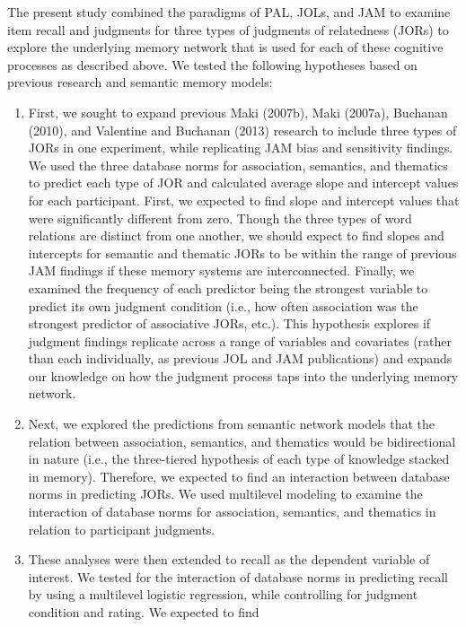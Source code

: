 \documentclass[english,man]{apa6}
\theoremstyle{definition}
\theoremstyle{definition}
\theoremstyle{definition}
\theoremstyle{remark}
\begin{document}
The present study combined the paradigms of PAL, JOLs, and JAM to
examine item recall and judgments for three types of judgments of
relatedness (JORs) to explore the underlying memory network that is used
for each of these cognitive processes as described above. We tested the
following hypotheses based on previous research and semantic memory
models:

\begin{enumerate}
\def\labelenumi{\arabic{enumi})}
\item
  First, we sought to expand previous Maki (2007b), Maki (2007a),
  Buchanan (2010), and Valentine and Buchanan (2013) research to include
  three types of JORs in one experiment, while replicating JAM bias and
  sensitivity findings. We used the three database norms for
  association, semantics, and thematics to predict each type of JOR and
  calculated average slope and intercept values for each participant.
  First, we expected to find slope and intercept values that were
  significantly different from zero. Though the three types of word
  relations are distinct from one another, we should expect to find
  slopes and intercepts for semantic and thematic JORs to be within the
  range of previous JAM findings if these memory systems are
  interconnected. Finally, we examined the frequency of each predictor
  being the strongest variable to predict its own judgment condition
  (i.e., how often association was the strongest predictor of
  associative JORs, etc.). This hypothesis explores if judgment findings
  replicate across a range of variables and covariates (rather than each
  individually, as previous JOL and JAM publications) and expands our
  knowledge on how the judgment process taps into the underlying memory
  network.
\item
  Next, we explored the predictions from semantic network models that
  the relation between association, semantics, and thematics would be
  bidirectional in nature (i.e., the three-tiered hypothesis of each
  type of knowledge stacked in memory). Therefore, we expected to find
  an interaction between database norms in predicting JORs. We used
  multilevel modeling to examine the interaction of database norms for
  association, semantics, and thematics in relation to participant
  judgments.
\item
  These analyses were then extended to recall as the dependent variable
  of interest. We tested for the interaction of database norms in
  predicting recall by using a multilevel logistic regression, while
  controlling for judgment condition and rating. We expected to find

\end{enumerate}
\end{document}
